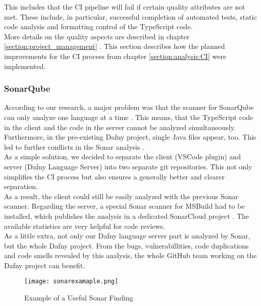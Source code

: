 {{This includes that the CI pipeline will fail if certain quality attributes are not met.
These include, in particular, successful completion of automated tests,
static code analysis and formatting control of the TypeScript code. \\

More details on the quality aspects are described in chapter \ref{section:project_management} .
This section describes how the planned improvements for the CI process from chapter \ref{section:analysis:CI} were implemented.

\subsubsection{SonarQube}
According to our research, a major problem was that the scanner for SonarQube can only analyze one language at a time \cite{sonar-supports-only-one-language}.
This means, that the TypeScript code in the client and the \CsharpWithSpace code in the server cannot be analyzed simultaneously.
Furthermore, in the pre-existing Dafny project, single Java files appear, too.
This led to further conflicts in the Sonar analysis \cite{sa}.\\

As a simple solution, we decided to separate the client (VSCode plugin) and server (Dafny Language Server) into two separate git repositories.
This not only simplifies the CI process but also ensures a generally better and clearer separation. \\

As a result, the client could still be easily analyzed with the previous Sonar scanner.
Regarding the server, a special Sonar scanner for MSBuild had to be installed, which publishes the analysis in a dedicated SonarCloud project \cite{dev}.
The available statistics are very helpful for code reviews.\\

As a little extra, not only our Dafny language server part is analyzed by Sonar,
but the whole Dafny project.
From the bugs, vulnerabillities, code duplications and code smells revealed
by this analysis, the whole GitHub team working on the Dafny project can benefit. \\

\begin{figure}[H]
    \centering
    \texttt{[image: sonarexamaple.png]}
    \caption{Example of a Useful Sonar Finding}
    \label{fig:sonarexample}
\end{figure}

}}
